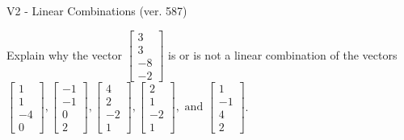 \begin{exercise}
  \begin{exerciseTitle}V2 - Linear Combinations (ver. 587)\end{exerciseTitle}
  \begin{exerciseStatement}
    Explain why the vector \(\left[\begin{array}{c}
3 \\
3 \\
-8 \\
-2
\end{array}\right]\)  is or is not a linear 
	combination of the vectors \(\left[\begin{array}{c}
1 \\
1 \\
-4 \\
0
\end{array}\right] , \left[\begin{array}{c}
-1 \\
-1 \\
0 \\
2
\end{array}\right] , \left[\begin{array}{c}
4 \\
2 \\
-2 \\
1
\end{array}\right] , \left[\begin{array}{c}
2 \\
1 \\
-2 \\
1
\end{array}\right] , \text{ and } \left[\begin{array}{c}
1 \\
-1 \\
4 \\
2
\end{array}\right]\).
	



\end{exerciseStatement}
\end{exercise}
